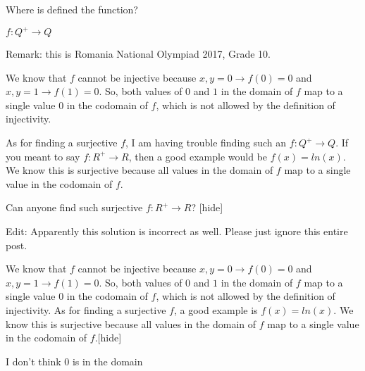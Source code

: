 \begin{solution}
	Where is defined the function?
\end{solution}



\begin{solution}
	$f:Q^+\longrightarrow Q $
\end{solution}



\begin{solution}
	Remark: this is Romania National Olympiad 2017, Grade 10.
\end{solution}



\begin{solution}We know that $f$ cannot be injective because $x, y = 0 \rightarrow f(0) = 0$ and $x, y = 1 \rightarrow f(1) = 0$. So, both values of $0$ and $1$ in the domain of $f$ map to a single value $0$ in the codomain of $f$, which is not allowed by the definition of injectivity. 

As for finding a surjective $f$, I am having trouble finding such an $f:Q^+\longrightarrow Q $. If you meant to say $f:R^+\longrightarrow R $, then a good example would be $f(x) = ln(x)$. We know this is surjective because all values in the domain of $f$ map to a single value in the codomain of $f$.

Can anyone find such surjective $f:R^+\longrightarrow R $?
[\/hide]


Edit: Apparently this solution is incorrect as well. Please just ignore this entire post.
\end{solution}



\begin{solution}
	\begin{tcolorbox}[hide=Solution]We know that $f$ cannot be injective because $x, y = 0 \rightarrow f(0) = 0$ and $x, y = 1 \rightarrow f(1) = 0$. So, both values of $0$ and $1$ in the domain of $f$ map to a single value $0$ in the codomain of $f$, which is not allowed by the definition of injectivity. As for finding a surjective $f$, a good example is $f(x) = ln(x)$. We know this is surjective because all values in the domain of $f$ map to a single value in the codomain of $f$.[\/hide]\end{tcolorbox}

I don't think $0$ is in the domain
\end{solution}



